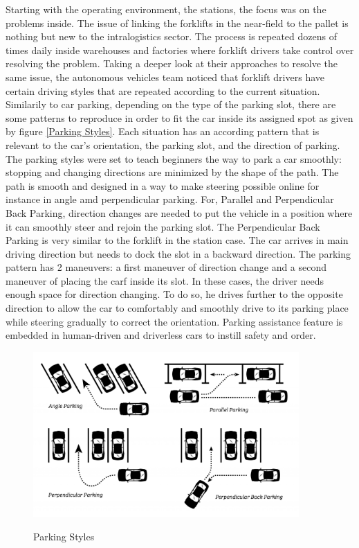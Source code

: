 Starting with the operating environment, the stations, the focus was on the problems inside. The issue of linking 
the forklifts in the near-field to the pallet is nothing but new to the intralogistics sector. 
The process is repeated dozens of times daily inside warehouses and factories where forklift drivers take control over 
resolving the problem. Taking a deeper look at their approaches to resolve the same issue, the autonomous vehicles team 
noticed that forklift drivers have certain driving styles that are repeated according to the current situation.
Similarily to car parking, depending on the type of the parking slot, there are some patterns to reproduce in order to fit 
the car inside its assigned spot as given by figure \ref{Parking Styles}. 
Each situation has an according pattern that is relevant to the car's orientation, the parking slot, 
and the direction of parking. The parking styles were set to teach beginners the way to park a car 
smoothly: stopping and changing directions are minimized by the shape of the path.
The path is smooth and designed in a way to make steering possible online for instance in angle 
amd perpendicular parking. For, Parallel and Perpendicular Back Parking, direction changes 
are needed to  put the vehicle in a position where it can smoothly steer and rejoin the parking slot.
The Perpendicular Back Parking is very similar to the forklift in the station case.
The car arrives in main driving direction but needs to dock the slot in a backward direction. 
The parking pattern has 2 maneuvers: a first maneuver of direction change and a second maneuver of 
placing the carf inside its slot.
In these cases, the driver needs 
enough space for direction changing. To do so, he drives further to the opposite direction to allow 
the car to comfortably and smoothly drive to its parking place while steering gradually to correct the orientation.
Parking assistance feature is embedded in human-driven and driverless cars to instill safety and order.

\begin{figure}
    [H]
    \begin{center}
    \includegraphics[width=4in]{images/Chap2/perpendicular-parking-a-lot-scaled.jpg}\\
    \caption{Parking Styles}
    \label{The Possible Parking Styles that a driver can follow }
    \end{center}
\end{figure}

